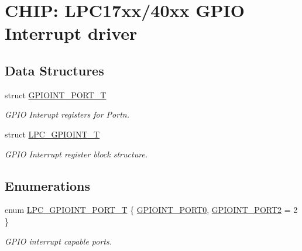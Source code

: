\hypertarget{group__GPIOINT__17XX__40XX}{\section{C\-H\-I\-P\-: L\-P\-C17xx/40xx G\-P\-I\-O Interrupt driver}
\label{group__GPIOINT__17XX__40XX}
}
\subsection*{Data Structures}
\begin{DoxyCompactItemize}
\item 
struct \hyperlink{structGPIOINT__PORT__T}{G\-P\-I\-O\-I\-N\-T\-\_\-\-P\-O\-R\-T\-\_\-\-T}
\begin{DoxyCompactList}\small\item\em G\-P\-I\-O Interupt registers for Portn. \end{DoxyCompactList}\item 
struct \hyperlink{structLPC__GPIOINT__T}{L\-P\-C\-\_\-\-G\-P\-I\-O\-I\-N\-T\-\_\-\-T}
\begin{DoxyCompactList}\small\item\em G\-P\-I\-O Interrupt register block structure. \end{DoxyCompactList}\end{DoxyCompactItemize}
\subsection*{Enumerations}
\begin{DoxyCompactItemize}
\item 
enum \hyperlink{group__GPIOINT__17XX__40XX_ga41631ac5e33fde341c0afe680ded9fee}{L\-P\-C\-\_\-\-G\-P\-I\-O\-I\-N\-T\-\_\-\-P\-O\-R\-T\-\_\-\-T} \{ \hyperlink{group__GPIOINT__17XX__40XX_gga41631ac5e33fde341c0afe680ded9feea976b0fb82055c52332950506a6621bba}{G\-P\-I\-O\-I\-N\-T\-\_\-\-P\-O\-R\-T0}, 
\hyperlink{group__GPIOINT__17XX__40XX_gga41631ac5e33fde341c0afe680ded9feeafd8afad46d3e74afccbdd0c806bc3aae}{G\-P\-I\-O\-I\-N\-T\-\_\-\-P\-O\-R\-T2} = 2
 \}
\begin{DoxyCompactList}\small\item\em G\-P\-I\-O interrupt capable ports. \end{DoxyCompactList}\end{DoxyCompactItemize}
